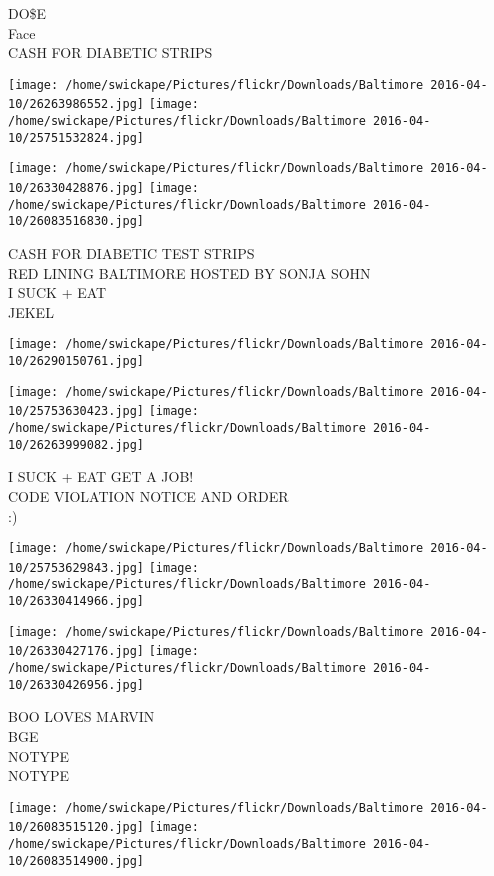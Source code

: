 \documentclass[10pt,letterpaper]{article}
\begin{document}
DO\$E\\
Face\\
CASH FOR DIABETIC STRIPS
\pagebreak

\texttt{[image: /home/swickape/Pictures/flickr/Downloads/Baltimore 2016-04-10/26263986552.jpg]}
\texttt{[image: /home/swickape/Pictures/flickr/Downloads/Baltimore 2016-04-10/25751532824.jpg]}

\texttt{[image: /home/swickape/Pictures/flickr/Downloads/Baltimore 2016-04-10/26330428876.jpg]}
\texttt{[image: /home/swickape/Pictures/flickr/Downloads/Baltimore 2016-04-10/26083516830.jpg]}

CASH FOR DIABETIC TEST STRIPS\\
RED LINING BALTIMORE HOSTED BY SONJA SOHN\\
I SUCK + EAT\\
JEKEL
\pagebreak

\texttt{[image: /home/swickape/Pictures/flickr/Downloads/Baltimore 2016-04-10/26290150761.jpg]}

\vspace{0.25in}
\texttt{[image: /home/swickape/Pictures/flickr/Downloads/Baltimore 2016-04-10/25753630423.jpg]}
\texttt{[image: /home/swickape/Pictures/flickr/Downloads/Baltimore 2016-04-10/26263999082.jpg]}

I SUCK + EAT GET A JOB!\\
CODE VIOLATION NOTICE AND ORDER\\
:)
\pagebreak

\texttt{[image: /home/swickape/Pictures/flickr/Downloads/Baltimore 2016-04-10/25753629843.jpg]}
\texttt{[image: /home/swickape/Pictures/flickr/Downloads/Baltimore 2016-04-10/26330414966.jpg]}

\texttt{[image: /home/swickape/Pictures/flickr/Downloads/Baltimore 2016-04-10/26330427176.jpg]}
\texttt{[image: /home/swickape/Pictures/flickr/Downloads/Baltimore 2016-04-10/26330426956.jpg]}

BOO LOVES MARVIN\\
BGE\\
NOTYPE\\
NOTYPE
\pagebreak

\texttt{[image: /home/swickape/Pictures/flickr/Downloads/Baltimore 2016-04-10/26083515120.jpg]}
\texttt{[image: /home/swickape/Pictures/flickr/Downloads/Baltimore 2016-04-10/26083514900.jpg]}
\end{document}
